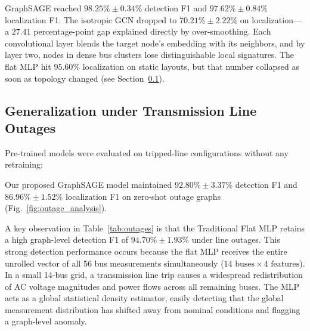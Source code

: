 \documentclass[conference]{IEEEtran}
\begin{document}
GraphSAGE reached $98.25\% \pm 0.34\%$ detection F1 and $97.62\% \pm 0.84\%$ localization F1. The isotropic GCN dropped to $70.21\% \pm 2.22\%$ on localization---a $27.41$ percentage-point gap explained directly by over-smoothing. Each convolutional layer blends the target node's embedding with its neighbors, and by layer two, nodes in dense bus clusters lose distinguishable local signatures. The flat MLP hit $95.60\%$ localization on static layouts, but that number collapsed as soon as topology changed (see Section~\ref{sec:outages}).

\subsection{Generalization under Transmission Line Outages}
\label{sec:outages}
Pre-trained models were evaluated on tripped-line configurations without any retraining:

\begin{table}[htbp]
  \caption{Generalization Metrics under Grid Reconfiguration}
  \label{tab:outages}
  \centering
\end{table}

Our proposed GraphSAGE model maintained $92.80\% \pm 3.37\%$ detection F1 and $86.96\% \pm 1.52\%$ localization F1 on zero-shot outage graphs (Fig.~\ref{fig:outage_analysis}). 

A key observation in Table~\ref{tab:outages} is that the Traditional Flat MLP retains a high graph-level detection F1 of $94.70\% \pm 1.93\%$ under line outages. This strong detection performance occurs because the flat MLP receives the entire unrolled vector of all 56 bus measurements simultaneously ($14 \text{ buses} \times 4 \text{ features}$). In a small 14-bus grid, a transmission line trip causes a widespread redistribution of AC voltage magnitudes and power flows across all remaining buses. The MLP acts as a global statistical density estimator, easily detecting that the global measurement distribution has shifted away from nominal conditions and flagging a graph-level anomaly.
\end{document}
